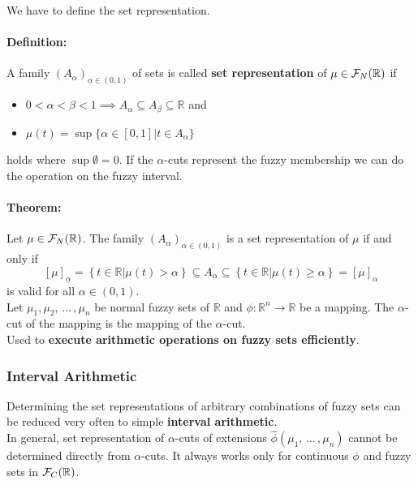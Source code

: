 We have to define the set representation.\\

\paragraph{Definition:} A family $(A_\alpha)_{\alpha \in (0,1)}$ of sets is called \textbf{set representation} of $\mu \in \mathcal{F}_N (\mathbb{R})$ if 
\begin{itemize}
	\item $0 < \alpha < \beta < 1 \implies A_\alpha \subseteq A_\beta \subseteq \mathbb{R}$ and
	\item $\mu (t) = \sup \{ \alpha \in [0,1] | t \in A_\alpha \}$
\end{itemize}
holds where $\sup \emptyset = 0$. If the $\alpha$-cuts represent the fuzzy membership we can do the operation on the fuzzy interval.\\

\paragraph{Theorem:} Let $\mu \in \mathcal{F}_N (\mathbb{R})$. The family $(A_\alpha)_{\alpha \in (0,1)}$ is a set representation of $\mu$ if and only if 
$$ [\mu]_{\underline{\alpha}} = \left\{t \in \mathbb{R} | \mu(t) > \alpha \right\} \subseteq A_\alpha \subseteq \left\{t \in \mathbb{R} | \mu(t) \geq \alpha\right\} = [\mu]_\alpha$$
is valid for all $\alpha \in (0,1)$.\\

Let $\mu_1, \mu_2, \, \dots \, , \mu_n$ be normal fuzzy sets of $\mathbb{R}$ and $\phi: \mathbb{R}^n \rightarrow \mathbb{R}$ be a mapping. The $\alpha$-cut of the mapping is the mapping of the $\alpha$-cut.\\

Used to \textbf{execute arithmetic operations on fuzzy sets efficiently}.\\

\newpage

\subsubsection{Interval Arithmetic}
Determining the set representations of arbitrary combinations of fuzzy sets can be reduced very often to simple \textbf{interval arithmetic}.\\

In general, set representation of $\alpha$-cuts of extensions $\hat{\phi} (\mu_1, \, \dots \, , \mu_n)$ cannot be determined directly from $\alpha$-cuts. It always works only for continuous $\phi$ and fuzzy sets in $\mathcal{F}_C (\mathbb{R})$.\\

